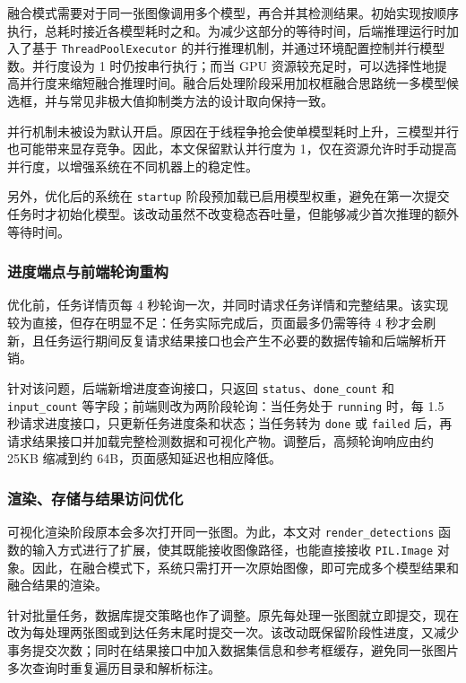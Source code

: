 融合模式需要对于同一张图像调用多个模型，再合并其检测结果。初始实现按顺序执行，总耗时接近各模型耗时之和。为减少这部分的等待时间，后端推理运行时加入了基于 \texttt{ThreadPoolExecutor} 的并行推理机制，并通过环境配置控制并行模型数。并行度设为 1 时仍按串行执行；而当 GPU 资源较充足时，可以选择性地提高并行度来缩短融合推理时间。融合后处理阶段采用加权框融合思路统一多模型候选框\cite{solovyev2021_wbf}，并与常见非极大值抑制类方法的设计取向保持一致\cite{bodla2017_softnms}。

并行机制未被设为默认开启。原因在于线程争抢会使单模型耗时上升，三模型并行也可能带来显存竞争。因此，本文保留默认并行度为 1，仅在资源允许时手动提高并行度，以增强系统在不同机器上的稳定性。

另外，优化后的系统在 \texttt{startup} 阶段预加载已启用模型权重，避免在第一次提交任务时才初始化模型。该改动虽然不改变稳态吞吐量，但能够减少首次推理的额外等待时间。

\subsubsection{进度端点与前端轮询重构}

优化前，任务详情页每 4 秒轮询一次，并同时请求任务详情和完整结果。该实现较为直接，但存在明显不足：任务实际完成后，页面最多仍需等待 4 秒才会刷新，且任务运行期间反复请求结果接口也会产生不必要的数据传输和后端解析开销。

针对该问题，后端新增进度查询接口，只返回 \texttt{status}、\texttt{done\_count} 和 \texttt{input\_count} 等字段；前端则改为两阶段轮询：当任务处于 \texttt{running} 时，每 1.5 秒请求进度接口，只更新任务进度条和状态；当任务转为 \texttt{done} 或 \texttt{failed} 后，再请求结果接口并加载完整检测数据和可视化产物。调整后，高频轮询响应由约 25KB 缩减到约 64B，页面感知延迟也相应降低。

\subsubsection{渲染、存储与结果访问优化}

可视化渲染阶段原本会多次打开同一张图。为此，本文对 \texttt{render\_detections} 函数的输入方式进行了扩展，使其既能接收图像路径，也能直接接收 \texttt{PIL.Image} 对象。因此，在融合模式下，系统只需打开一次原始图像，即可完成多个模型结果和融合结果的渲染。

针对批量任务，数据库提交策略也作了调整。原先每处理一张图就立即提交，现在改为每处理两张图或到达任务末尾时提交一次。该改动既保留阶段性进度，又减少事务提交次数；同时在结果接口中加入数据集信息和参考框缓存，避免同一张图片多次查询时重复遍历目录和解析标注。

